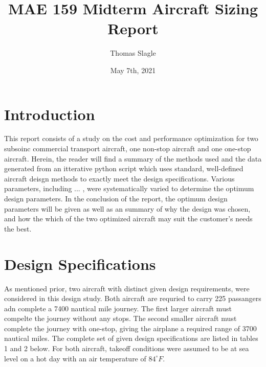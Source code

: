 \documentclass{article}
\title{MAE 159 Midterm Aircraft Sizing Report}
\author{Thomas Slagle}
\date{May 7th, 2021}
\begin{document}
    \maketitle

    \section{Introduction}
    \begin{flushleft}
        This report consists of a study on the cost and performance optimization
        for two subsoinc commercial transport aircraft, one non-stop aircraft
        and one one-stop aircraft. Herein, the reader will find a summary of the
        methods used and the data generated from an itterative python script
        which uses standard, well-defined aircraft deisgn methods to exactly
        meet the design specifications. Various parameters, including ... , were
        systematically varied to determine the optimum design parameters. In the
        conclusion of the report, the optimum design parameters will be given as
        well as an summary of why the design was chosen, and how the which of
        the two optimized aircraft may suit the customer's needs the best.
    \end{flushleft}

    \section{Design Specifications}
    \begin{flushleft}
        As mentioned prior, two aircraft with distinct given design
        requirements, were considered in this design study. Both aircraft are
        requried to carry 225 passangers adn complete a 7400 nautical mile
        journey. The first larger aircraft must compelte the journey without any
        stops. The second smaller aircraft must complete the journey with
        one-stop, giving the airplane a required range of 3700 nautical miles.
        The complete set of given design specifications are listed in tables 1
        and 2 below. For both aircraft, takeoff conditions were assumed to be at
        sea level on a hot day with an air temperature of $84^{\circ}F$.
    \end{flushleft}
\end{document}
